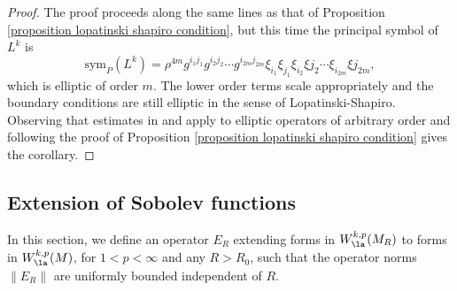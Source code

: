 \documentclass[hidelinks, 12pt, oneside, reqno]{amsart}
\begin{document}
\begin{proof}
    The proof proceeds along the same lines as that of Proposition \ref{proposition lopatinski shapiro condition}, but this time the principal symbol of $L^k$ is
    \[
    \mathrm{sym}_P(L^k) = \rho^{4m}g^{i_1j_1}g^{i_2j_2}\cdots g^{i_{2m}j_{2m}}\xi_{i_1}\xi_{j_1}\xi_{i_2}\xi{j_2}\cdots \xi_{i_{2m}}\xi{j_{2m}},
    \]
    which is elliptic of order $m$. The lower order terms scale appropriately and the boundary conditions are still elliptic in the sense of Lopatinski-Shapiro. Observing that estimates in \cite[Corollary 10.3.9]{NicolaescuManifoldLectures} and \cite[Theorem 1.6.2]{HodgeDecompSchwarz} apply to elliptic operators of arbitrary order and following the proof of Proposition \ref{proposition lopatinski shapiro condition} gives the corollary.
\end{proof}

\subsection{Extension of Sobolev functions}

In this section, we define an operator $E_R$ extending forms in $W^{k,p}_{\la}(M_R)$ to forms in $W^{k,p}_{\la}(M)$, for $1 < p < \infty$ and any $R > R_0$, such that the operator norms $\|E_R\|$ are uniformly bounded independent of $R$.  
\end{document}
